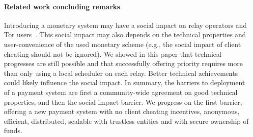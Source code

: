 \paragraph*{Related work concluding remarks}
Introducing a monetary system may have a social impact on relay operators and Tor users~\cite{jansenblogpost}. This social impact may also depends on the technical properties and user-convenience of the used monetary scheme (e.g., the social impact of client cheating should not be ignored). We showed in this paper that technical progresses are still possible and that successfully offering priority requires more than only using a local scheduler on each relay. Better technical achievements could likely influence the social impact. In summary, the barriers to deployment of a payment system are first a community-wide agreement on good technical properties, and then the social impact barrier. We progress on the first barrier, offering a new payment system with no client cheating incentives, anonymous, efficient, distributed, scalable with trustless entities and with secure ownership of funds.



